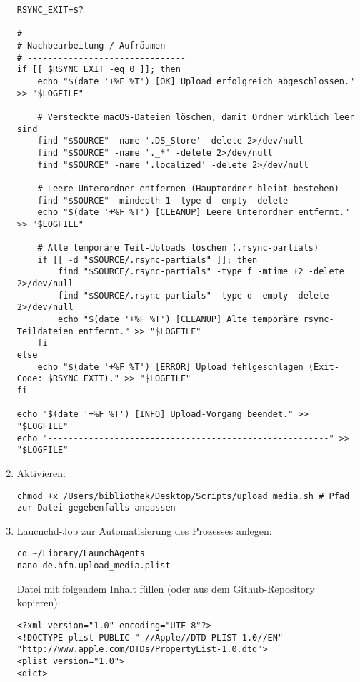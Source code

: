 \documentclass[12pt,a4paper]{report}
\begin{document}
\begin{enumerate}
\begin{verbatim}
RSYNC_EXIT=$?

# -------------------------------
# Nachbearbeitung / Aufräumen
# -------------------------------
if [[ $RSYNC_EXIT -eq 0 ]]; then
    echo "$(date '+%F %T') [OK] Upload erfolgreich abgeschlossen." >> "$LOGFILE"

    # Versteckte macOS-Dateien löschen, damit Ordner wirklich leer sind
    find "$SOURCE" -name '.DS_Store' -delete 2>/dev/null
    find "$SOURCE" -name '._*' -delete 2>/dev/null
    find "$SOURCE" -name '.localized' -delete 2>/dev/null

    # Leere Unterordner entfernen (Hauptordner bleibt bestehen)
    find "$SOURCE" -mindepth 1 -type d -empty -delete
    echo "$(date '+%F %T') [CLEANUP] Leere Unterordner entfernt." >> "$LOGFILE"

    # Alte temporäre Teil-Uploads löschen (.rsync-partials)
    if [[ -d "$SOURCE/.rsync-partials" ]]; then
        find "$SOURCE/.rsync-partials" -type f -mtime +2 -delete 2>/dev/null
        find "$SOURCE/.rsync-partials" -type d -empty -delete 2>/dev/null
        echo "$(date '+%F %T') [CLEANUP] Alte temporäre rsync-Teildateien entfernt." >> "$LOGFILE"
    fi
else
    echo "$(date '+%F %T') [ERROR] Upload fehlgeschlagen (Exit-Code: $RSYNC_EXIT)." >> "$LOGFILE"
fi

echo "$(date '+%F %T') [INFO] Upload-Vorgang beendet." >> "$LOGFILE"
echo "-------------------------------------------------------" >> "$LOGFILE"
    \end{verbatim}

    \item Aktivieren:
    \begin{verbatim}
chmod +x /Users/bibliothek/Desktop/Scripts/upload_media.sh # Pfad zur Datei gegebenfalls anpassen
    \end{verbatim}

    \item Laucnchd-Job zur Automatisierung des Prozesses anlegen:
    \begin{verbatim}
cd ~/Library/LaunchAgents
nano de.hfm.upload_media.plist
    \end{verbatim}

    Datei mit folgendem Inhalt füllen (oder aus dem Github-Repository kopieren):

    \begin{verbatim}
<?xml version="1.0" encoding="UTF-8"?>
<!DOCTYPE plist PUBLIC "-//Apple//DTD PLIST 1.0//EN" "http://www.apple.com/DTDs/PropertyList-1.0.dtd">
<plist version="1.0">
<dict>


\end{verbatim}
\end{enumerate}
\end{document}
